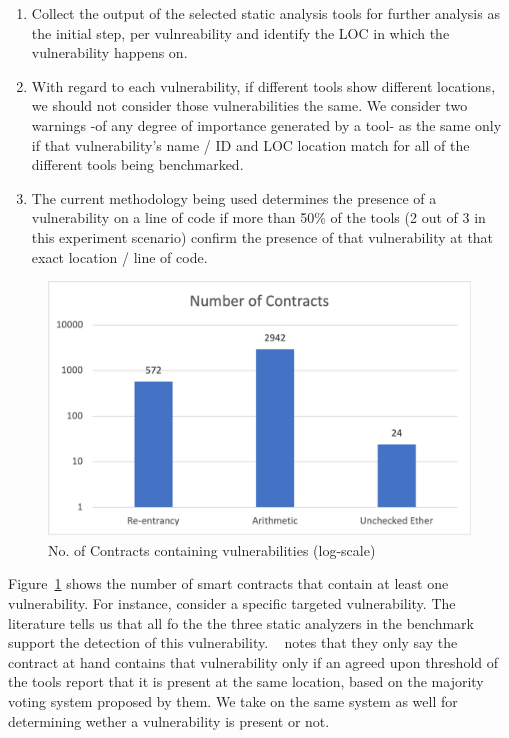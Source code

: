 	\begin{enumerate}
	
	\item Collect the output of the selected static analysis tools for further analysis as the initial step, per vulnreability and identify the LOC in which the vulnerability happens on.
	
	\item With regard to each vulnerability, if different tools show different locations, we should not consider those vulnerabilities the same.
		We consider two warnings -of any degree of importance generated by a tool- as the same only if that vulnerability's name / ID and LOC location match for all of the different tools being benchmarked.
	
	\item The current methodology being used determines the presence of a vulnerability on a line of code if more than 50\% of the tools (2 out of 3 in this experiment scenario) confirm the presence of that vulnerability at that exact location / line of code.
	
	\end{enumerate}
	
	\begin{figure}[t]
		\centering
		\includegraphics[width=1\textwidth]{figures/Picture1.png}
		\caption{No. of Contracts containing vulnerabilities (log-scale)}
		\label{fig:chart_vuln_count}
	\end{figure}
		
		Figure~\ref{fig:chart_vuln_count} shows the number of smart contracts that contain at least one vulnerability.
		For instance, consider a specific targeted vulnerability.
		The literature tells us that all fo the the three static analyzers in the benchmark support the detection of this vulnerability.
		~\cite{yashavant2022scrawld} notes that they only say the contract at hand contains that vulnerability only if an agreed upon threshold of the tools report that it is present at the same location,
		based on the majority voting system proposed by them. We take on the same system as well for determining wether a vulnerability is present or not.



